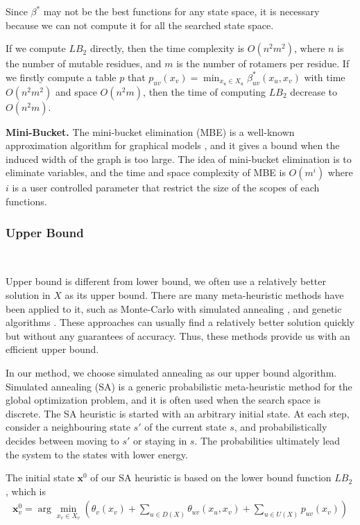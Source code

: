 Since $\beta^*$ may not be the best functions for any state space, it is necessary because we can not compute it for all the searched state space.

If we compute $LB_2$ directly, then the time complexity is $O(n^2m^2)$, where $n$ is the number of mutable residues, and $m$ is the number of rotamers per residue. If we firstly compute a table $p$ that $p_{uv}(x_v)=\min_{x_u\in X_u}\beta_{uv}^*(x_u,x_v)$ with time $O(n^2m^2)$ and space $O(n^2m)$, then the time of computing $LB_2$ decrease to $O(n^2m)$.

\noindent\textbf{Mini-Bucket.} The mini-bucket elimination (MBE) is a well-known approximation algorithm for graphical models \cite[]{dechter2003mini, rollon2010evaluating, rollon2006mini}, and it gives a bound when the induced width of the graph is too large. The idea of mini-bucket elimination is to eliminate variables, and the time and space complexity of MBE is $O(m^i)$ where $i$ is a user controlled parameter that restrict the size of the scopes of each functions.

\subsubsection{Upper Bound}\

Upper bound is different from lower bound, we often use a relatively better solution in $X$ as its upper bound. There are many meta-heuristic methods have been applied to it, such as Monte-Carlo with simulated annealing \cite[]{kuhlman2000native, voigt2000trading}, and genetic algorithms \cite[]{raha2000prediction}. These approaches can usually find a relatively better solution quickly but without any guarantees of accuracy. Thus, these methods provide us with an efficient upper bound.

In our method, we choose simulated annealing as our upper bound algorithm. Simulated annealing (SA) is a generic probabilistic meta-heuristic method for the global optimization problem, and it is often used when the search space is discrete. The SA heuristic is started with an arbitrary initial state. At each step, consider a neighbouring state $s'$ of the current state $s$, and probabilistically decides between moving to $s'$ or staying in $s$. The probabilities ultimately lead the system to the states with lower energy.

The initial state $\mathbf{x}^0$ of our SA heuristic is based on the lower bound function $LB_2$, which is
\begin{align*}
\mathbf{x}_v^0\!=\!\arg\!\min_{x_v\in X_v}\left(\theta_v(x_v)\!+\!\sum_{u\in D(X)}\theta_{uv}(x_u,x_v)\!+\!\sum_{u\in U(X)}p_{uv}(x_v)\right)
\end{align*}

